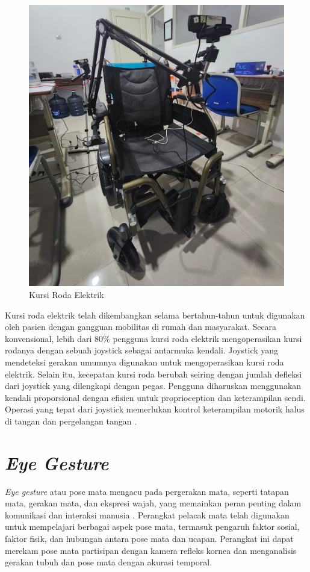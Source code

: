 \begin{figure}[H]
  \centering

  \includegraphics[width=.47\textwidth]{gambar/bab3/wheel.jpeg}

  \caption{Kursi Roda Elektrik}
  \label{fig:kursiroda}
\end{figure}

Kursi roda elektrik telah dikembangkan selama bertahun-tahun untuk digunakan oleh pasien dengan gangguan mobilitas di rumah dan masyarakat. Secara konvensional, lebih dari 80\% pengguna kursi roda elektrik mengoperasikan kursi rodanya dengan sebuah joystick sebagai antarmuka kendali. Joystick yang mendeteksi gerakan umumnya digunakan untuk mengoperasikan kursi roda elektrik. Selain itu, kecepatan kursi roda berubah seiring dengan jumlah defleksi dari joystick yang dilengkapi dengan pegas. Pengguna diharuskan menggunakan kendali proporsional dengan efisien untuk proprioception dan keterampilan sendi. Operasi yang tepat dari joystick memerlukan kontrol keterampilan motorik halus di tangan dan pergelangan tangan \parencite{koyama23}.



\section{\emph{Eye Gesture}}

\textit{Eye gesture} atau pose mata mengacu pada pergerakan mata, seperti tatapan mata, gerakan mata, dan ekspresi wajah, yang memainkan peran penting dalam komunikasi dan interaksi manusia \parencite{vanni_2022}. Perangkat pelacak mata telah digunakan untuk mempelajari berbagai aspek pose mata, termasuk pengaruh faktor sosial, faktor fisik, dan hubungan antara pose mata dan ucapan. Perangkat ini dapat merekam pose mata partisipan dengan kamera refleks kornea dan menganalisis gerakan tubuh dan pose mata dengan akurasi temporal\parencite{gullberg_kita_2009}.

